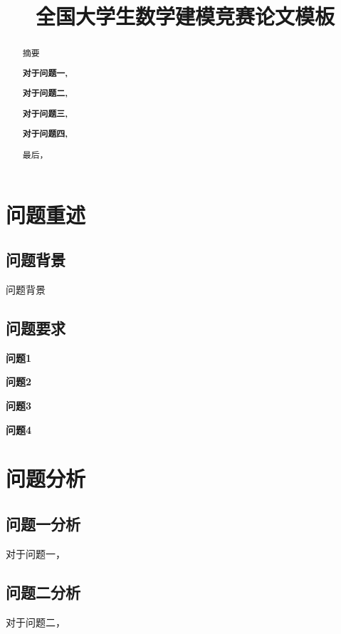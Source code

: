 \documentclass[withoutpreface,bwprint]{cumcmthesis}
\title{全国大学生数学建模竞赛论文模板}  %
\begin{document}
\maketitle
\begin{abstract}
摘要

\textbf{对于问题一,}

\textbf{对于问题二,}

\textbf{对于问题三,}

\textbf{对于问题四,}

最后，



\end{abstract}


\section{问题重述}
\subsection{问题背景}
问题背景


\subsection{问题要求}

\textbf{问题1}  

\textbf{问题2}  

\textbf{问题3} 

\textbf{问题4}  


\section{问题分析}
\subsection{问题一分析}
对于问题一，

\subsection{问题二分析}	
对于问题二，
\end{document}
